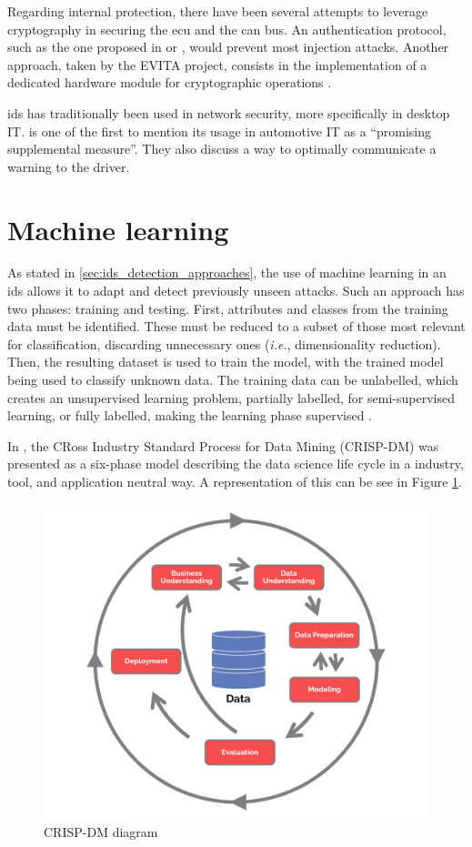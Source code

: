 Regarding internal protection, there have been several attempts to leverage cryptography in securing the \gls{ecu} and the \gls{can} bus. An authentication protocol, such as the one proposed in \citep{Herrewege2011} or \citep{Groza2018}, would prevent most injection attacks. Another approach, taken by the EVITA project, consists in the implementation of a dedicated hardware module for cryptographic operations \citep{Wolf2011}.\par

\gls{ids} has traditionally been used in network security, more specifically in desktop IT. \citep{hoppe2009applying} is one of the first to mention its usage in automotive IT as a “promising supplemental measure”. They also discuss a way to optimally communicate a warning to the driver.

\section{Machine learning}

As stated in \ref{sec:ids_detection_approaches}, the use of machine learning in an \gls{ids} allows it to adapt and detect previously unseen attacks. Such an approach has two phases: training and testing. First, attributes and classes from the training data must be identified. These must be reduced to a subset of those most relevant for classification, discarding unnecessary ones (\textit{i.e.}, dimensionality reduction). Then, the resulting dataset is used to train the model, with the trained model being used to classify unknown data. The training data can be unlabelled, which creates an unsupervised learning problem, partially labelled, for semi-supervised learning, or fully labelled, making the learning phase supervised \citep{Buczak2016}.\par

In \citep{Shearer2000}, the CRoss Industry Standard Process for Data Mining (CRISP-DM) was presented as a six-phase model describing the data science life cycle in a industry, tool, and application neutral way. A representation of this can be see in Figure \ref{fig:CRISP-DM}.

\begin{figure}
    \centering
    \includegraphics[width = .7\textwidth]{img/parts/introduction/CRISP-DM.png}
    \caption{CRISP-DM diagram \citep{DSPA}}
    \label{fig:CRISP-DM}
\end{figure}

